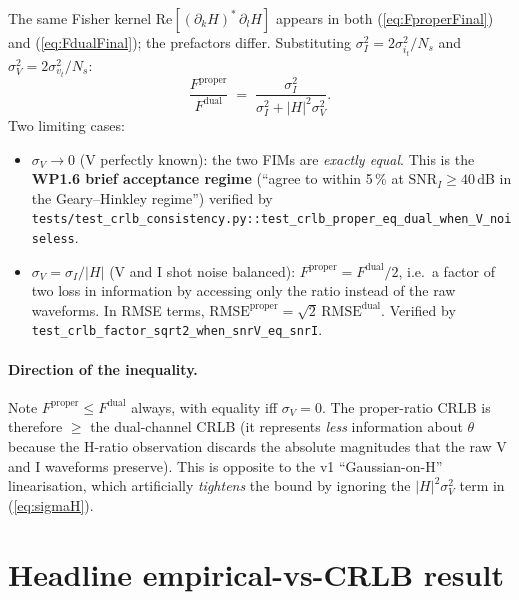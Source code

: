 \documentclass[11pt,a4paper]{article}
\begin{document}
The same Fisher kernel $\mathrm{Re}\!\left[(\partial_k H)^{*}
\,\partial_l H\right]$ appears in both (\ref{eq:FproperFinal}) and
(\ref{eq:FdualFinal}); the prefactors differ.  Substituting
$\sigma_I^2 = 2\sigma_{i_t}^2/N_s$ and $\sigma_V^2 = 2\sigma_{v_t}^2/N_s$:
\begin{equation}
   \frac{F^{\mathrm{proper}}}{F^{\mathrm{dual}}}
        \;=\; \frac{\sigma_I^2}{\sigma_I^2 + |H|^2 \sigma_V^2}.
   \label{eq:ratio}
\end{equation}
Two limiting cases:
\begin{itemize}[leftmargin=2em]
  \item $\sigma_V \to 0$ (V perfectly known): the two FIMs are
        \emph{exactly equal}.  This is the \textbf{WP1.6 brief
        acceptance regime} (``agree to within 5\,\% at
        $\mathrm{SNR}_I \geq 40$\,dB in the Geary--Hinkley regime'')
        verified by
        \texttt{tests/test\_crlb\_consistency.py::test\_crlb\_proper\_eq\_dual\_when\_V\_noiseless}.
  \item $\sigma_V = \sigma_I/|H|$ (V and I shot noise balanced):
        $F^{\mathrm{proper}} = F^{\mathrm{dual}}/2$, i.e.\ a factor
        of two loss in information by accessing only the ratio
        instead of the raw waveforms.  In RMSE terms,
        $\mathrm{RMSE}^{\mathrm{proper}} = \sqrt{2}\,
        \mathrm{RMSE}^{\mathrm{dual}}$.  Verified by
        \texttt{test\_crlb\_factor\_sqrt2\_when\_snrV\_eq\_snrI}.
\end{itemize}

\paragraph{Direction of the inequality.}  Note $F^{\mathrm{proper}}
\leq F^{\mathrm{dual}}$ always, with equality iff $\sigma_V = 0$.
The proper-ratio CRLB is therefore $\geq$ the dual-channel CRLB
(it represents \emph{less} information about $\theta$ because the
H-ratio observation discards the absolute magnitudes that the raw V
and I waveforms preserve).  This is opposite to the v1
``Gaussian-on-H'' linearisation, which artificially \emph{tightens}
the bound by ignoring the $|H|^2 \sigma_V^2$ term in
(\ref{eq:sigmaH}).

\section{Headline empirical-vs-CRLB result}
\end{document}

